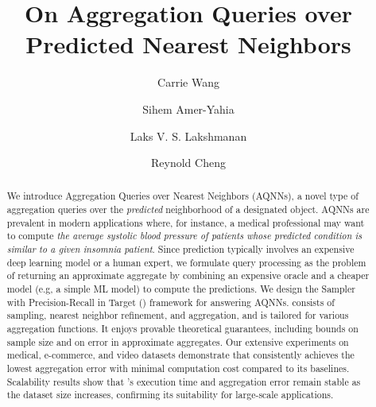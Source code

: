 \documentclass[sigconf, nonacm]{acmart}
\newcommand{\sprint}{\text{{\footnotesize SPRinT}}\xspace}
\begin{document}
\title{On Aggregation Queries over Predicted Nearest Neighbors}

\renewcommand{\shortauthors}{Wang et. al}
\author{Carrie Wang}

\author{Sihem Amer-Yahia}

\author{Laks V. S. Lakshmanan}

\author{Reynold Cheng}

\begin{abstract}
We introduce Aggregation Queries over Nearest Neighbors (AQNNs), a novel type of aggregation queries over the \textit{predicted} neighborhood of a designated object. AQNNs are prevalent in modern applications where, for instance, a medical professional may want to compute {\em the average systolic blood pressure of patients whose predicted condition is similar to a given insomnia patient}. Since prediction typically involves an expensive deep learning model or a human expert, we formulate query processing as the problem of returning an approximate aggregate by combining an expensive oracle and a cheaper model (e.g, a simple ML model) to compute the predictions. We design the Sampler with Precision-Recall in Target (\sprint) framework for answering AQNNs. \sprint consists of sampling, nearest neighbor refinement, and aggregation, and is tailored for various aggregation functions. It enjoys provable theoretical guarantees, including bounds on sample size and on error in approximate aggregates. Our extensive experiments on medical, e-commerce, and video datasets demonstrate that \sprint consistently achieves the lowest aggregation error with minimal computation cost compared to its baselines. Scalability results show that \sprint's execution time and aggregation error remain stable as the dataset size increases, confirming its suitability for large-scale applications.
\end{abstract}
\end{document}
